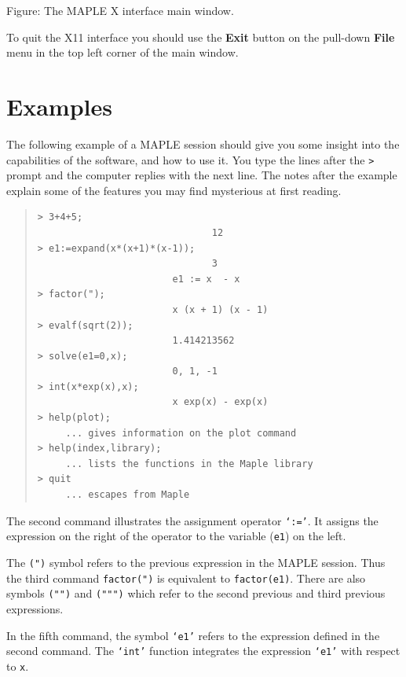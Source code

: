 \documentclass[twoside,11pt]{article}
\newcommand{\htmladdimg}[1]{}
\newcommand{\xlabel}[1]{}
\begin{document}
\begin{htmlonly}
\label{fig_main_window}
\htmladdimg{../sun107_f1.gif}

Figure: The MAPLE X interface main window.
\end{htmlonly}

To quit the X11 interface you should use the \textbf{Exit} button on the
pull-down \textbf{File} menu in the top left corner of the main window.

\section{Examples\xlabel{examples}}

The following example of a MAPLE session should give you some insight
into the capabilities of the software, and how to use it.  You type the
lines after the \verb+>+ prompt and the computer replies with the next line.
The notes after the example explain some of the features you may find
mysterious at first reading.

\begin{quote}\begin{verbatim}
> 3+4+5;
                               12
> e1:=expand(x*(x+1)*(x-1));
                               3
                        e1 := x  - x
> factor(");
                        x (x + 1) (x - 1)
> evalf(sqrt(2));
                        1.414213562
> solve(e1=0,x);
                        0, 1, -1
> int(x*exp(x),x);
                        x exp(x) - exp(x)
> help(plot);
     ... gives information on the plot command
> help(index,library);
     ... lists the functions in the Maple library
> quit
     ... escapes from Maple
\end{verbatim}\end{quote}

The second command illustrates the assignment operator \texttt{`:='}. It
assigns the expression on the right of the operator to the variable
(\texttt{e1}) on the left.

The \texttt{(")} symbol refers to the previous expression in the MAPLE
session. Thus the third command \texttt{factor(")} is equivalent to
\texttt{factor(e1)}. There are also symbols \texttt{("")} and \texttt{(""")}
which refer to the second previous and third previous expressions.

In the fifth command, the symbol \texttt{`e1'} refers to the expression
defined in the second command. The \texttt{`int'} function integrates the
expression \texttt{`e1'} with respect to \texttt{x}.
\end{document}
